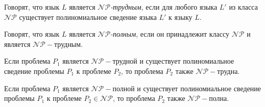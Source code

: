 \begin{definition}
    Говорят, что язык $L$ является $\mathscr{NP}$\textit{-трудным}, если для любого языка $L'$ из класса $\mathscr{NP}$ существует полиномиальное сведение языка $L'$ к языку $L$.
\end{definition}

\begin{definition}
    Говорят, что язык $L$ является $\mathscr{NP}$\textit{-полным}, если он принадлежит классу $\mathscr{NP}$ и является $\mathscr{NP}-$трудным.
\end{definition}

\begin{theorem}
    Если проблема $P_1$ является $\mathscr{NP}-$трудной и существует полиномиальное сведение проблемы $P_1$ к проблеме $P_2$, то проблема $P_2$ также $\mathscr{NP}-$трудна.
\end{theorem}

\begin{corollary}
    Если проблема $P_1$ является $\mathscr{NP}-$полной и существует полиномиальное сведение проблемы $P_1$ к проблеме $P_2\in \mathscr{NP}$, то проблема $P_2$ также $\mathscr{NP}-$полна.
\end{corollary}